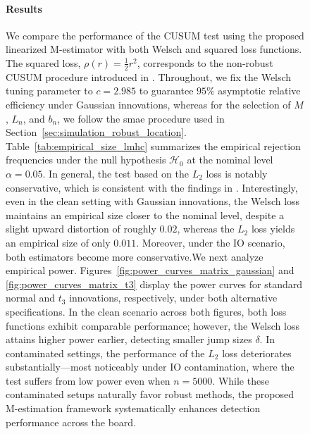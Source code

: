 \documentclass[10pt, a4paper]{article}
\theoremstyle{assumption}
\theoremstyle{definition}
\theoremstyle{theorem}
\begin{document}
\begin{figure}
\paragraph{Results}
We compare the performance of the CUSUM test using the proposed linearized M-estimator with both Welsch and squared loss functions. The squared loss, $\rho(r) = \frac{1}{2}r^2$, corresponds to the non-robust CUSUM procedure introduced in \citet{Mies2023}. Throughout, we fix the Welsch tuning parameter to $c = 2.985$ to guarantee $95\%$ asymptotic relative efficiency under Gaussian innovations, whereas for the selection of $M$, $L_n$, and $b_n$, we follow the smae procedure used in Section~\ref{sec:simulation_robust_location}. Table~\ref{tab:empirical_size_lmhc} summarizes the empirical rejection frequencies under the null hypothesis $\mathcal{H}_0$ at the nominal level $\alpha = 0.05$. In general, the test based on the $L_2$ loss is notably conservative, which is consistent with the findings in \citet{Mies2023}. Interestingly, even in the clean setting with Gaussian innovations, the Welsch loss maintains an empirical size closer to the nominal level, despite a slight upward distortion of roughly $0.02$, whereas the $L_2$ loss yields an empirical size of only $0.011$. Moreover, under the IO scenario, both estimators become more conservative.We next analyze empirical power. Figures~\ref{fig:power_curves_matrix_gaussian} and \ref{fig:power_curves_matrix_t3} display the power curves for standard normal and $t_3$ innovations, respectively, under both alternative specifications. In the clean scenario across both figures, both loss functions exhibit comparable performance; however, the Welsch loss attains higher power earlier, detecting smaller jump sizes $\delta$. In contaminated settings, the performance of the $L_2$ loss deteriorates substantially—most noticeably under IO contamination, where the test suffers from low power even when $n = 5000$. While these contaminated setups naturally favor robust methods, the proposed M-estimation framework systematically enhances detection performance across the board.




\end{figure}
\end{document}

